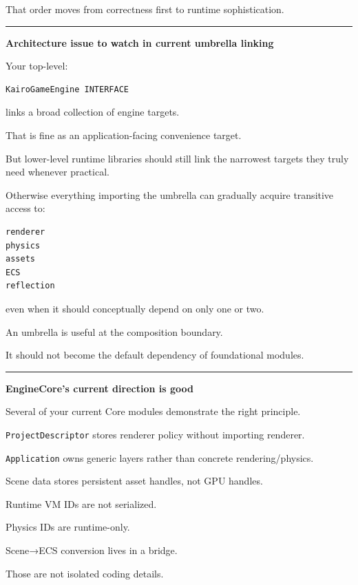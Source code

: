 That order moves from correctness first to runtime sophistication.

\begin{center}\rule{0.5\linewidth}{0.5pt}\end{center}

\textbf{Architecture issue to watch in current umbrella linking}

Your top-level:

\begin{verbatim}
KairoGameEngine INTERFACE
\end{verbatim}

links a broad collection of engine targets.

That is fine as an application-facing convenience target.

But lower-level runtime libraries should still link the narrowest targets they truly need whenever practical.

Otherwise everything importing the umbrella can gradually acquire transitive access to:

\begin{verbatim}
renderer
physics
assets
ECS
reflection
\end{verbatim}

even when it should conceptually depend on only one or two.

An umbrella is useful at the composition boundary.

It should not become the default dependency of foundational modules.

\begin{center}\rule{0.5\linewidth}{0.5pt}\end{center}

\textbf{EngineCore's current direction is good}

Several of your current Core modules demonstrate the right principle.

\texttt{ProjectDescriptor} stores renderer policy without importing renderer.

\texttt{Application} owns generic layers rather than concrete rendering/physics.

Scene data stores persistent asset handles, not GPU handles.

Runtime VM IDs are not serialized.

Physics IDs are runtime-only.

Scene→ECS conversion lives in a bridge.

Those are not isolated coding details.

